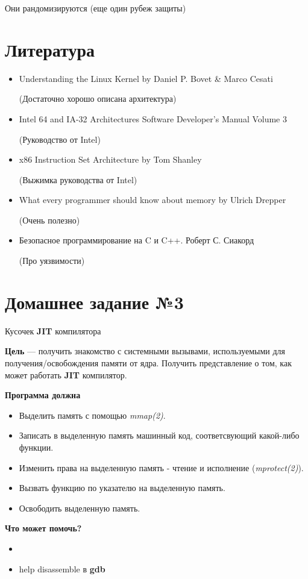 \documentclass[../../lectures.tex]{subfiles}
\begin{document}
Они рандомизируются (еще один рубеж защиты)

\newpage
\section{Литература}
\begin{itemize}
    \item Understanding the Linux Kernel by Daniel P. Bovet \& Marco Cesati

          (Достаточно хорошо описана архитектура)
    \item Intel 64 and IA-32 Architectures Software Developer's Manual Volume 3

          (Руководство от Intel)
    \item x86 Instruction Set Architecture by Tom Shanley

          (Выжимка руководства от Intel)
    \item What every programmer should know about memory by Ulrich Drepper

          (Очень полезно)
    \item Безопасное программирование на C и C++. Роберт С. Сиакорд

          (Про уязвимости)
\end{itemize}

\section{Домашнее задание №3}
Кусочек \textbf{JIT} компилятора

\textbf{Цель} --- получить знакомство с системными вызывами, используемыми для получения/освобождения
памяти от ядра. Получить представление о том, как может работать \textbf{JIT} компилятор.

\textbf{Программа должна}
\begin{itemize}
    \item Выделить память с помощью \emph{mmap(2)}.
    \item Записать в выделенную память машинный код, соответсвующий какой-либо функции.
    \item Изменить права на выделенную память - чтение и исполнение (\emph{mprotect(2)}).
    \item Вызвать функцию по указателю на выделенную память.
    \item Освободить выделенную память.
\end{itemize}

\textbf{Что может помочь?}
\begin{itemize}
    \item {}
    \item help disassemble в \textbf{gdb}
\end{itemize}
\end{document}
